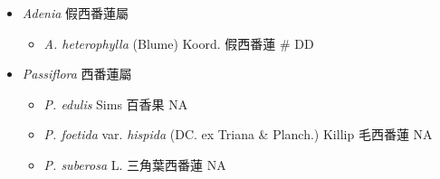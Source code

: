 
  \begin{itemize}
 \item[] \textit{Adenia} 假西番蓮屬
                                
  \begin{itemize}
        \item[] \textit{A. heterophylla} (Blume) Koord.  假西番蓮  \# DD
  \end{itemize}
 \item[] \textit{Passiflora} 西番蓮屬
                                
  \begin{itemize}
        \item[] \textit{P. edulis} Sims  百香果   NA
        \item[] \textit{P. foetida} var. \textit{hispida} (DC. ex Triana \& Planch.) Killip  毛西番蓮   NA
        \item[] \textit{P. suberosa} L.  三角葉西番蓮   NA
  \end{itemize}
  \end{itemize}
